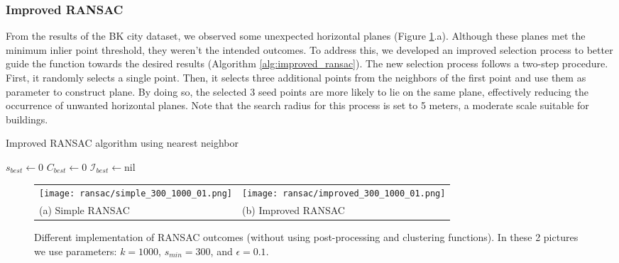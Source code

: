\documentclass[a4paper,9pt]{article}
\begin{document}
\subsubsection{Improved RANSAC}
From the results of the BK city dataset, we observed some unexpected horizontal planes (Figure \ref{fig:improved_ransac}.a). Although these planes met the minimum inlier point threshold, they weren't the intended outcomes. To address this, we developed an improved selection process to better guide the function towards the desired results (Algorithm \ref{alg:improved_ransac}). 
The new selection process follows a two-step procedure. First, it randomly selects a single point. Then, it selects three additional points from the neighbors of the first point and use them as parameter to construct plane. By doing so, the selected 3 seed points are more likely to lie on the same plane, effectively reducing the occurrence of unwanted horizontal planes. Note that the search radius for this process is set to 5 meters, a moderate scale suitable for buildings.

\begin{algorithm}[H]
\caption{Improved RANSAC algorithm using nearest neighbor}
\label{alg:improved_ransac}

$s_{best} \gets 0$\;
$C_{best} \gets 0$\;
$\mathcal{I}_{best} \gets \text{nil}$\;
\end{algorithm}

\begin{figure}[H]
    \begin{tabularx}{\textwidth}{XX}
        \texttt{[image: ransac/simple\_300\_1000\_01.png]} &
        \texttt{[image: ransac/improved\_300\_1000\_01.png]} \\
        (a) Simple RANSAC & (b) Improved RANSAC
    \end{tabularx}
    \caption{Different implementation of RANSAC outcomes (without using post-processing and clustering functions). In these 2 pictures we use parameters: $k=1000$, $s_{min}=300$, and $\epsilon=0.1$.}
    \label{fig:improved_ransac}
\end{figure}
\end{document}
